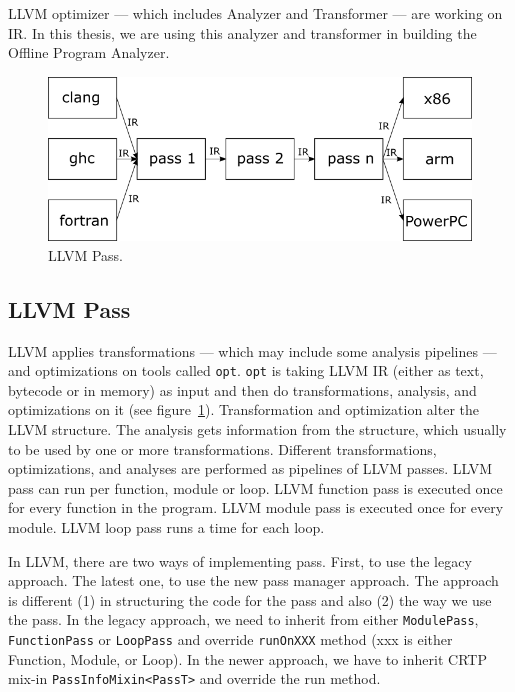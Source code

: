 LLVM optimizer --- which includes Analyzer and Transformer --- are working on
IR. In this thesis, we are using this analyzer and transformer in building the
Offline Program Analyzer.

\begin{figure}[htbp] 
    \centerline{\includegraphics[scale=.75]{Figures/03/llvm-overview.png}} 
    \caption{LLVM Pass.} 
    \label{fig:llvm} 
\end{figure} 

\subsection{LLVM Pass}

LLVM applies transformations --- which may include some analysis pipelines ---
and optimizations on tools called \texttt{opt}. \texttt{opt} is taking LLVM IR
(either as text, bytecode or in memory) as input and then do transformations,
analysis, and optimizations on it (see figure~\ref{fig:llvm}). Transformation
and optimization alter the LLVM structure. The analysis gets information from
the structure, which usually to be used by one or more transformations.
Different transformations, optimizations, and analyses are performed as
pipelines of LLVM passes. LLVM pass can run per function, module or loop. LLVM
function pass is executed once for every function in the program. LLVM module
pass is executed once for every module. LLVM loop pass runs a time for each
loop.  


In LLVM, there are two ways of implementing pass. First, to use the legacy
approach. The latest one, to use the new pass manager approach. The approach is
different (1) in structuring the code for the pass and also (2) the way we use
the pass. In the legacy approach, we need to inherit from either
\texttt{ModulePass}, \texttt{FunctionPass} or \texttt{LoopPass} and override
\texttt{runOnXXX} method (xxx is either Function, Module, or Loop). In the newer
approach, we have to inherit CRTP mix-in \texttt{PassInfoMixin<PassT>} and
override the run method.

